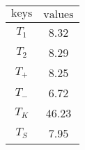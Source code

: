 \begin{minipage}{0.49\textwidth}
 \centering
 \begin{tabular}{S|S}
 \toprule
 $\text{keys}$ & $\text{values}$ \\
 \midrule
$T_{1}$  &  8.32  \\
$T_{2}$  &  8.29  \\
$T_{+}$  &  8.25   \\
$T_{-}$  & 6.72  \\
$T_{K}$  &  46.23  \\
$T_{S}$ & 7.95 \\

 \bottomrule
 \end{tabular}
 \label{tab:mids_T_70}
  \end{minipage}
